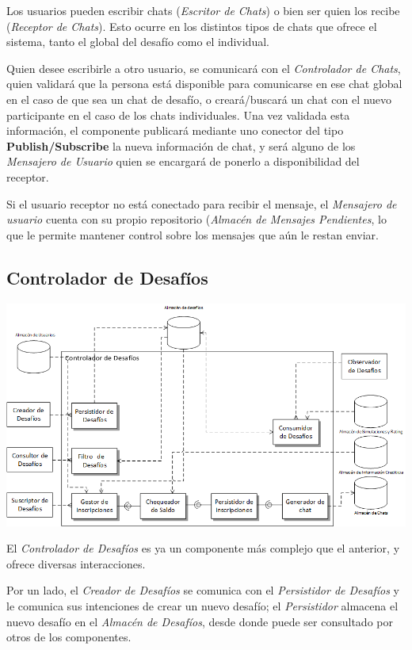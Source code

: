 Los usuarios pueden escribir chats (\emph{Escritor de Chats}) o bien ser quien los recibe (\emph{Receptor de Chats}). Esto ocurre en los distintos tipos de chats que ofrece el sistema, tanto el global del desafío como el individual. 

Quien desee escribirle a otro usuario, se comunicará con el \emph{Controlador de Chats}, quien validará que la persona está disponible para comunicarse en ese chat global en el caso de que sea un chat de desafío, o creará/buscará un chat con el nuevo participante en el caso de los chats individuales. Una vez validada esta información, el componente publicará mediante uno conector del tipo \textbf{Publish/Subscribe} la nueva información de chat, y será alguno de los \emph{Mensajero de Usuario} quien se encargará de ponerlo a disponibilidad del receptor. 

Si el usuario receptor no está conectado para recibir el mensaje, el \emph{Mensajero de usuario} cuenta con su propio repositorio (\emph{Almacén de Mensajes Pendientes}, lo que le permite mantener control sobre los mensajes que aún le restan enviar.

\newpage
\subsection{Controlador de Desafíos}
\begin{center}
\includegraphics[scale=0.80,angle=90]{diagramas/controlador_de_desafios}
\label{fig:controlador_de_desafios}
\end{center}

El \emph{Controlador de Desafíos} es ya un componente más complejo que el anterior, y ofrece diversas interacciones.

Por un lado, el \emph{Creador de Desafíos} se comunica con el \emph{Persistidor de Desafíos} y le comunica sus intenciones de crear un nuevo desafío; el \emph{Persistidor} almacena el nuevo desafío en el \emph{Almacén de Desafíos}, desde donde puede ser consultado por otros de los componentes.


